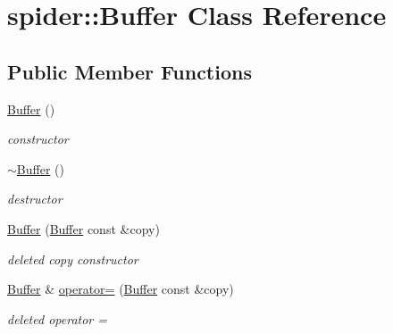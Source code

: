 \hypertarget{classspider_1_1_buffer}{}\section{spider\+:\+:Buffer Class Reference}
\label{classspider_1_1_buffer}
\subsection*{Public Member Functions}
\begin{DoxyCompactItemize}
\item 
\mbox{\label{classspider_1_1_buffer_af201de92e727d150af51e181638cf906}} 
\hyperlink{classspider_1_1_buffer_af201de92e727d150af51e181638cf906}{Buffer} ()
\begin{DoxyCompactList}\small\item\em constructor \end{DoxyCompactList}\item 
\mbox{\label{classspider_1_1_buffer_a1148f793a22acc190d4db9133716b139}} 
\hyperlink{classspider_1_1_buffer_a1148f793a22acc190d4db9133716b139}{$\sim$\+Buffer} ()
\begin{DoxyCompactList}\small\item\em destructor \end{DoxyCompactList}\item 
\mbox{\label{classspider_1_1_buffer_a12e139c6be3d340bad46fbe31f49a054}} 
\hyperlink{classspider_1_1_buffer_a12e139c6be3d340bad46fbe31f49a054}{Buffer} (\hyperlink{classspider_1_1_buffer}{Buffer} const \&copy)
\begin{DoxyCompactList}\small\item\em deleted copy constructor \end{DoxyCompactList}\item 
\mbox{\label{classspider_1_1_buffer_a1bf4d0c0c59cc33b43f71c26192cbb81}} 
\hyperlink{classspider_1_1_buffer}{Buffer} \& \hyperlink{classspider_1_1_buffer_a1bf4d0c0c59cc33b43f71c26192cbb81}{operator=} (\hyperlink{classspider_1_1_buffer}{Buffer} const \&copy)
\begin{DoxyCompactList}\small\item\em deleted operator = \end{DoxyCompactList}\item 

\end{DoxyCompactItemize}
